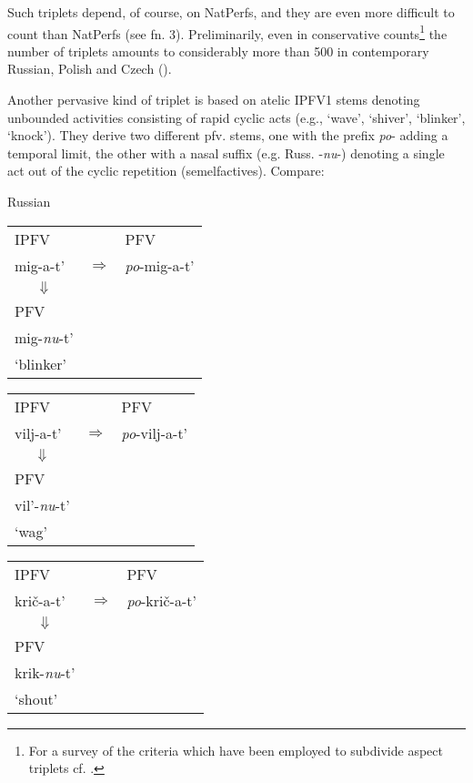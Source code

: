 \documentclass[output=paper]{langscibook}
\begin{document}
Such triplets depend, of course, on NatPerfs, and they are even more difficult to count than NatPerfs (see fn. 3). Preliminarily, even in conservative counts\footnote{For a survey of the criteria which have been employed to subdivide aspect triplets cf. \citet[51--56]{Wiemer2019}.} the number of triplets amounts to considerably more than 500 in contemporary Russian, Polish and Czech (\citealt[§3.2]{WiemerEtAlForthc}).

Another pervasive kind of triplet is based on atelic IPFV1 stems denoting unbounded activities consisting of rapid cyclic acts (e.g., ‘wave’, ‘shiver’, ‘blinker’, ‘knock’). They derive two different pfv. stems, one with the prefix \textit{po}{}- adding a temporal limit, the other with a nasal suffix (e.g. Russ. -\textit{nu}{}-) denoting a single act out of the cyclic repetition (semelfactives). Compare:\largerpage[-1] 

\ea \label{ex:wiemer:5}Russian\\
    \ea \begin{tabular}[t]{@{} lcl @{}}
         IPFV &  & PFV\\
          {mig-a-t'}    & $\Rightarrow$ &{\textit{po}-mig-a-t'} \\
         \multicolumn{1}{c}{$\Downarrow$} \\
         PFV\\
         {mig-\textit{nu}-t'}\\
         `blinker'
         \end{tabular}
    \ex \begin{tabular}[t]{@{} lcl @{}}
         IPFV &  & PFV\\
         {vilj-a-t'}     & $\Rightarrow$ & {\textit{po}-vilj-a-t'}\\
         \multicolumn{1}{c}{$\Downarrow$} \\
         PFV\\
         {vil'-\textit{nu}-t'}\\
         `wag'
         \end{tabular}
    \ex \begin{tabular}[t]{@{} lcl @{}}
         IPFV &  & PFV\\
          {kri\v{c}-a-t'}    & $\Rightarrow$ & {\textit{po}-kri\v{c}-a-t'} \\
         \multicolumn{1}{c}{$\Downarrow$} \\
         PFV\\
         {krik-\textit{nu}-t'}\\
         `shout'
         \end{tabular}                  
         \z
\z
\end{document}
